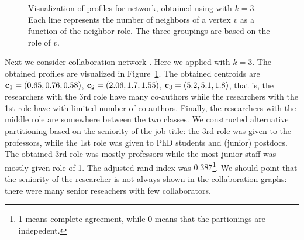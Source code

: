 \begin{figure}[ht!]
\caption{Visualization of profiles for \collab network, obtained using \alginitdeg with $k = 3$.
Each line represents the number of neighbors of a vertex $v$ as a
function of the neighbor role. The three groupings are based on the role of $v$.}
\label{fig:collab}
\end{figure}


Next we consider collaboration network \collab. Here we applied \alginitdeg
with $k = 3$. The obtained profiles are visualized in Figure~\ref{fig:collab}.
The obtained centroids are
$\mathbf{c}_1 = (0.65, 0.76, 0.58)$, $\mathbf{c}_2 = (2.06, 1.7, 1.55)$, $\mathbf{c}_3 = (5.2, 5.1, 1.8)$, 
that is, the researchers with the 3rd role have many co-authors while the researchers with the 1st role
have with limited number of co-authors. Finally, the researchers with the middle role are somewhere between
the two classes. We constructed alternative partitioning based on the seniority of the job title:
the 3rd role was given to the professors, while the 1st role was given to PhD students and (junior) postdocs.
The obtained 3rd role was mostly professors while the most junior staff was mostly given role of 1.
The adjusted rand index was $0.387$\footnote{1 means complete agreement, while 0 means that the partionings are indepedent.}.
We should point that the seniority of the researcher is not always shown in the collaboration graphs: 
there were many senior reseachers with few collaborators.


